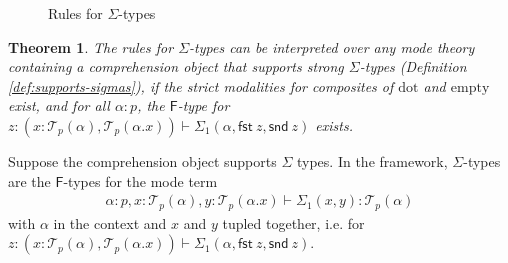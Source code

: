 \documentclass[10pt]{article}
\newtheorem{theorem}{Theorem}
\theoremstyle{definition}
\newcommand\dsd[1]{\ensuremath{\mathsf{#1}}}
\newcommand{\yields}{\vdash}
\newcommand{\app}[2]{\ensuremath{#1 \: #2}}
\newcommand{\sigmacl}[3]{\ensuremath{(#1{:}#2,#3)}}
\newcommand{\fst}[1]{\app{\dsd{fst}}{#1}}
\newcommand{\snd}[1]{\app{\dsd{snd}}{#1}}
\newcommand\El[2]{\mathcal{T}_{#1}(#2)}
\newcommand{\sdot}{\ensuremath{\mathrm{dot}}}
\newcommand{\sempty}{\ensuremath{\mathrm{empty}}}
\newcommand\qvar[1]{\ensuremath{\mathsf{var}_{#1}}}
\newcommand\qpair[1]{\ensuremath{\mathsf{pair}_{#1}}}
\begin{document}
\begin{figure}
\caption{Rules for $\Sigma$-types}\label{fig:qit-sigma-rules}
\end{figure}

\begin{theorem}
The rules for $\Sigma$-types can be interpreted over any mode theory
containing a comprehension object that supports strong $\Sigma$-types
(Definition \ref{def:supports-sigmas}),
if
the strict modalities for composites of $\sdot$ and $\sempty$ exist, and
for all $\alpha : p$,
the $\mathsf{F}$-type for $z : \sigmacl{x}{\El p \alpha}{\El p
  {\alpha.x}} \vdash \Sigma_1(\alpha,\fst z, \snd z)$ exists.
\end{theorem}

Suppose the comprehension object supports $\Sigma$ types. In the framework, $\Sigma$-types are the $\mathsf{F}$-types for the mode term
\begin{align*}
\alpha : p, x : \El{p}{\alpha}, y : \El{p}{\alpha.x} \yields \Sigma_1(x,y) : \El{p}{\alpha}
\end{align*}
with $\alpha$ in the context and $x$ and $y$ tupled together, i.e. for
$z : \sigmacl{x}{\El p \alpha}{\El p
  {\alpha.x}} \vdash \Sigma_1(\alpha,\fst z, \snd z)$.  
\end{document}
